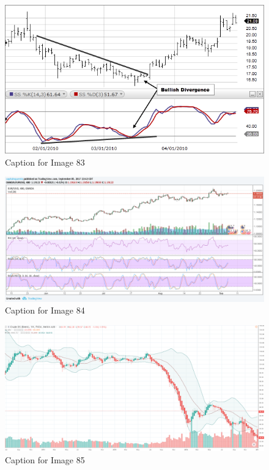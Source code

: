 \documentclass{article}
\begin{document}
\vspace{10pt}

\begin{figure}[!htb]
    \centering
    \includegraphics[width=\textwidth]{imgs/83.png}
    \caption{Caption for Image 83}
\end{figure}

\vspace{10pt}

\begin{figure}[!htb]
    \centering
    \includegraphics[width=\textwidth]{imgs/84.png}
    \caption{Caption for Image 84}
\end{figure}

\vspace{10pt}

\begin{figure}[!htb]
    \centering
    \includegraphics[width=\textwidth]{imgs/85.png}
    \caption{Caption for Image 85}
\end{figure}
\end{document}
